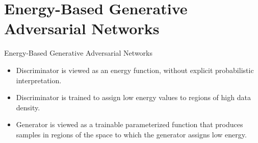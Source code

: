 \documentclass[mathserif]{beamer}
\begin{document}
\section{Energy-Based Generative Adversarial Networks}
\begin{frame}{Energy-Based Generative Adversarial Networks}
  \begin{itemize}
    \item Discriminator is viewed as an energy function, without explicit probabilistic interpretation.
    \item Discriminator is trained to assign low energy values to regions of high data density.
    \item Generator is viewed as a trainable parameterized function that produces samples in regions
    of the space to which the generator assigns low energy.
  \end{itemize}
\end{frame}
\end{document}
